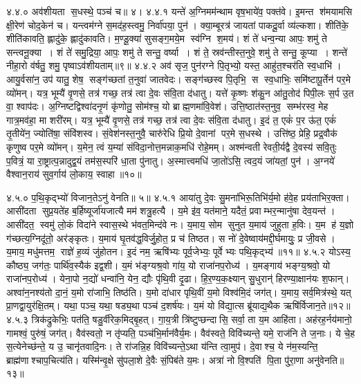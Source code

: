 ४.४.०
अव॑शीयता स॒धस्थे॒ पञ्च॑ च॥ ४।
४.४.१
यन्ते॑ अ॒ग्निमम॑न्थाम वृष॒भाये॑व॒ पक्त॑वे। इ॒मन्त श॑मयामसि क्षी॒रेण॑ चोद॒केन॑ च। यन्त्वम॑ग्ने स॒मद॑ह॒स्त्वमु॒ निर्वा॑पया॒ पुन॑। क्या॒म्बूरत्र॑ जायतां पाकदू॒र्वा व्य॑ल्कशा। शीति॑के॒ शीति॑कावति॒ ह्लादु॑के॒ ह्लादु॑कावति। म॒ण्डू॒क्या॑ सुसङ्ग॒मये॒म स्व॑ग्नि श॒मय॑। शं ते॑ धन्व॒न्या आपः॒ शमु॑ ते सन्त्वनू॒क्या। शं ते॑ समु॒द्रिया॒ आपः॒ शमु॑ ते सन्तु॒ वर्ष्या। शं ते॒ स्रव॑न्तीस्त॒नुवे॒ शमु॑ ते सन्तु॒ कूप्या। शन्ते॑ नीहा॒रो व॑र्\mbox{}षतु॒ शमु॒ पृष्वाऽव॑शीयताम्॥९॥
४.४.२
अव॑ सृज॒ पुन॑रग्ने पि॒तृभ्यो॒ यस्त॒ आहु॑त॒श्चर॑ति स्व॒धाभि॑। आयु॒र्वसा॑न॒ उप॑ यातु॒ शेष॒ सङ्ग॑च्छतां त॒नुवा॑ जातवेदः। सङ्ग॑च्छस्व पि॒तृभि॒ स स्व॒धाभिः॒ समि॑ष्टापू॒र्तेन॑ पर॒मे व्यो॑मन्। यत्र॒ भूम्यै॑ वृ॒णसे॒ तत्र॑ गच्छ॒ तत्र॑ त्वा दे॒वः स॑वि॒ता द॑धातु। यत्ते॑ कृ॒ष्णः  श॑कु॒न आ॑तु॒तोद॑ पिपी॒लः स॒र्प उ॒त वा॒ श्वाप॑दः। अ॒ग्निष्टद्विश्वा॑दनृ॒णं कृ॑णोतु॒ सोम॑श्च॒ यो ब्राह्म॒णमा॑वि॒वेश॑। उत्ति॒ष्ठात॑स्त॒नुव॒ सम्भ॑रस्व॒ मेह गात्र॒मव॑हा॒ मा शरी॑रम्। यत्र॒ भूम्यै॑ वृ॒णसे॒ तत्र॑ गच्छ॒ तत्र॑ त्वा दे॒वः स॑वि॒ता द॑धातु। इ॒दं त॒ एकं॑ प॒र ऊ॑त॒ एकं॑ तृ॒तीये॑न॒ ज्योति॑षा॒ संवि॑शस्व। सं॒वेश॑नस्त॒नुवै॒ चारु॑रेधि प्रि॒यो दे॒वानां पर॒मे स॒धस्थे। उत्ति॑ष्ठ॒ प्रेहि॒ प्रद्र॒वौक॑ कृणुष्व पर॒मे व्यो॑मन्। य॒मेन॒ त्वं य॒म्या॑ संविदा॒नोत्त॒मन्नाक॒मधि॑ रोहे॒मम्। अश्म॑न्वती रेवती॒र्यद्वै दे॒वस्य॑ सवि॒तुः प॒वित्रं॒ या रा॒ष्ट्रात्प॒न्नादुद्व॒यं तम॑स॒स्परि॑ धा॒ता पु॑नातु। अ॒स्मात्त्वमधि॑ जा॒तो॑ऽसि॒ त्वद॒यं जा॑यतां॒ पुन॑। अ॒ग्नये॑ वैश्वान॒राय॑ सुव॒र्गाय॑ लो॒काय॒ स्वाहा॥१०॥
\anuvakamend

४.५.०
प॒थि॒कृद्भ्यो॑ विजान॒तेऽनु॑ वेनति॥ ५॥
४.५.१
आया॑तु दे॒वः सु॒मना॑भिरू॒तिभि॑र्य॒मो ह॑वे॒ह प्रय॑ताभिर॒क्ता। आसी॑दता सुप्र॒यते॑ह ब॒र्\mbox{}हिष्यूर्जा॑यजात्यै मम॑ शत्रु॒हत्यै। य॒मे इ॑व॒ यत॑माने॒ यदैतं॒ प्रवाम्भर॒न्मानु॑षा देव॒यन्त॑। आसी॑दत॒ स्वमु॑ लो॒कं  विदा॑ने स्वास॒स्थे भ॑वत॒मिन्द॑वे नः। य॒माय॒ सोम सुनुत य॒माय॑ जुहुता ह॒विः। य॒म ह॑ य॒ज्ञो ग॑च्छत्य॒ग्निदू॑तो॒ अर॑ङ्कृतः। य॒माय॑ घृ॒तव॑द्ध॒विर्जु॒होत॒ प्र च॑ तिष्ठत। स नो॑ दे॒वेष्वाय॑मद्दी॒र्घमायुः॒ प्र जी॒वसे। य॒माय॒ मधु॑मत्तम॒ राज्ञे॑ ह॒व्यं जु॑होतन। इ॒दं नम॒ ऋषि॑भ्यः पूर्व॒जेभ्यः॒ पूर्वेभ्यः पथि॒कृद्भ्य॑॥११॥
४.५.२
योऽस्य॒ कौष्ठ्य॒ जग॑तः॒ पार्थि॑व॒स्यैक॑ इद्व॒शी। य॒मं भ॑ङ्ग्यश्र॒वो गा॑य॒ यो राजा॑नप॒रोध्य॑। य॒मङ्गाय॑ भङ्ग्य॒श्रवो॒ यो राजा॑नप॒रोध्य॑। येना॒पो न॒द्यो॑ धन्वा॑नि॒ येन॒ द्यौः पृ॑थि॒वी दृ॒ढा। हि॒र॒ण्य॒क॒क्ष्यान् सु॒धुरान्॑ हिरण्या॒क्षान॑यः  श॒फान्। अश्वा॑न॒नश्य॑तो दा॒नं॒ य॒मो रा॑जाभि॒ तिष्ठ॑ति। य॒मो दा॑धार पृथि॒वीं य॒मो विश्व॑मि॒दं जग॑त्। य॒माय॒ सर्व॒मित्र॑स्थे॒ यत् प्रा॒णद्वा॒युर॑क्षि॒तम्। यथा॒ पञ्च॒ यथा॒ षड्य॒था पञ्च॑ द॒शर्\mbox{}ष॑यः। य॒मं यो वि॑द्या॒त्स ब्रू॑याद्य॒थैक ऋषि॑र्विजान॒ते॥१२॥
४.५.३
त्रिक॑द्रुकेभिः॒ पत॑ति॒ षडु॒र्वीरेक॒मिद्बृ॒हत्। गा॒य॒त्री त्रि॑ष्टुप्छन्दासि॒ सर्वा॒ ता य॒म आहि॑ता। अह॑रह॒र्नय॑मानो॒ गामश्वं॒ पुरु॑षं॒ जग॑त्। वैव॑स्वतो॒ न तृ॑प्यति॒ पञ्च॑भि॒र्मान॑वैर्य॒मः। वैव॑स्वते॒ विवि॑च्यन्ते॒ यमे॒ राज॑नि ते ज॒नाः। ये चे॒ह स॒त्येनेच्छ॑न्ते॒ य उ॒ चानृ॑तवादि॒नः। ते रा॑जन्नि॒ह विवि॑च्यन्ते॒ऽथा य॑न्ति त्वा॒मुप॑। दे॒वाश्च॒ ये न॑म॒स्यन्ति॒ ब्राह्म॑णाश्चाप॒चित्य॑ति। यस्मि॑न्वृ॒क्षे सु॑पला॒शे दे॒वैः सं॒पिब॑ते य॒मः। अत्रा॑ नो वि॒श्पति॑ पि॒ता पु॑रा॒णा अनु॑वेनति॥१३॥
\anuvakamend

